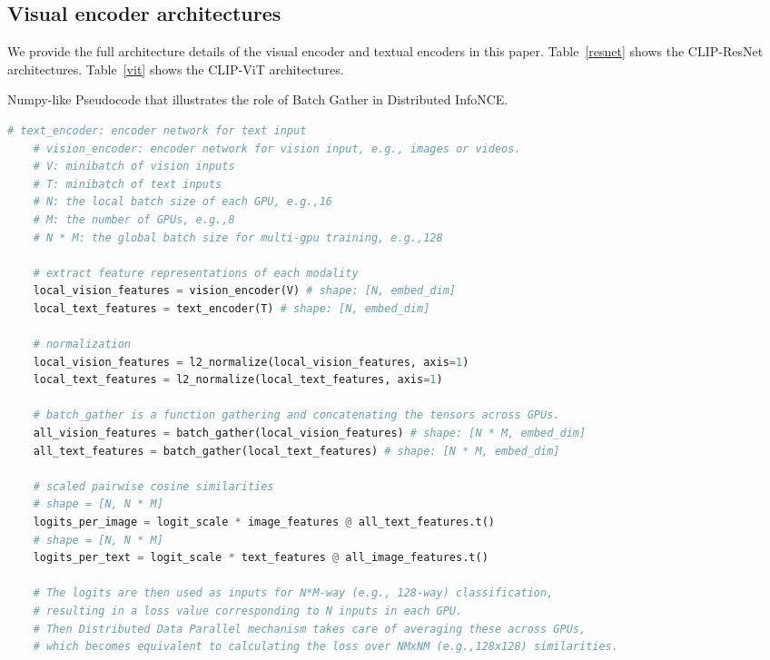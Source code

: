 \documentclass[letterpaper]{article} \usepackage{aaai23}  \usepackage{times}  \usepackage{helvet}  \usepackage{courier}  \usepackage[hyphens]{url}  \usepackage{graphicx} \urlstyle{rm} \def\UrlFont{\rm}  \usepackage{natbib}  \usepackage{caption} \frenchspacing  \setlength{\pdfpagewidth}{8.5in}  \setlength{\pdfpageheight}{11in}  \usepackage{algorithm}
\begin{document}
\subsection{Visual encoder architectures}\label{sec:vis_encoder}
We provide the full architecture details of the visual encoder and textual encoders in this paper. Table~\ref{resnet} shows the CLIP-ResNet architectures. Table~\ref{vit} shows the CLIP-ViT architectures.






\begin{algorithm*}[h]
	\caption{Numpy-like Pseudocode that illustrates the role of Batch Gather in Distributed InfoNCE.}
	\label{batch_gather}
	\begin{lstlisting}[language=python]
    # text_encoder: encoder network for text input
    # vision_encoder: encoder network for vision input, e.g., images or videos.
    # V: minibatch of vision inputs
    # T: minibatch of text inputs
    # N: the local batch size of each GPU, e.g.,16
    # M: the number of GPUs, e.g.,8
    # N * M: the global batch size for multi-gpu training, e.g.,128
    
    # extract feature representations of each modality
    local_vision_features = vision_encoder(V) # shape: [N, embed_dim]
    local_text_features = text_encoder(T) # shape: [N, embed_dim]

    # normalization
    local_vision_features = l2_normalize(local_vision_features, axis=1)
    local_text_features = l2_normalize(local_text_features, axis=1)
    
    # batch_gather is a function gathering and concatenating the tensors across GPUs. 
    all_vision_features = batch_gather(local_vision_features) # shape: [N * M, embed_dim]
    all_text_features = batch_gather(local_text_features) # shape: [N * M, embed_dim]
    
    # scaled pairwise cosine similarities
    # shape = [N, N * M]
    logits_per_image = logit_scale * image_features @ all_text_features.t()  
    # shape = [N, N * M]
    logits_per_text = logit_scale * text_features @ all_image_features.t() 
    
    # The logits are then used as inputs for N*M-way (e.g., 128-way) classification, 
    # resulting in a loss value corresponding to N inputs in each GPU. 
    # Then Distributed Data Parallel mechanism takes care of averaging these across GPUs, 
    # which becomes equivalent to calculating the loss over NMxNM (e.g.,128x128) similarities.
	\end{lstlisting}
\end{algorithm*}
\end{document}
